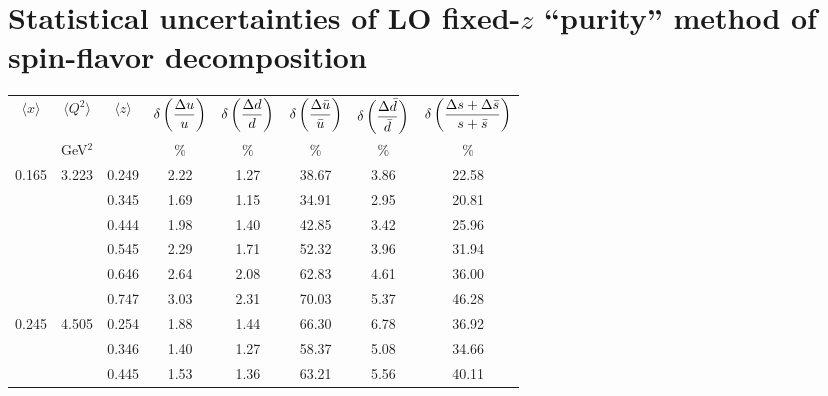 \section{ Statistical uncertainties of LO fixed-$z$ ``purity''  method of spin-flavor decomposition}
\begin{table}[htbp]
\begin{center}
\begin{tabular}{|ccc||ccccc|}
\hline
$\langle x \rangle $   & $ \langle Q^2 \rangle $   &  $\langle z \rangle$ & $\displaystyle{\delta \left({ \Delta u \over u} \right)}$  & $\displaystyle{\delta \left({ \Delta d \over d} \right)}$&
$\displaystyle{ \delta \left({ \Delta \bar{u} \over\bar{u}} \right)}$ & $\displaystyle{\delta \left({ \Delta \bar{d} \over\bar{d}} \right)}$ &  $\displaystyle{\delta \left({ \Delta s + \Delta  \bar{s} \over s+ \bar{s}} \right)}$  \\
                       & GeV$^2$              &        &  $\%$  &   $\%$    &  $\%$    &     $\%$    &       $\%$                                                   \\ \hline 
  0.165 &   3.223 &   0.249 &         2.22 &         1.27 &        38.67 &         3.86 &        22.58 \\
         &          &    0.345 &         1.69 &         1.15 &        34.91 &         2.95 &        20.81 \\
         &          &    0.444 &         1.98 &         1.40 &        42.85 &         3.42 &        25.96 \\
         &          &    0.545 &         2.29 &         1.71 &        52.32 &         3.96 &        31.94 \\
         &          &    0.646 &         2.64 &         2.08 &        62.83 &         4.61 &        36.00 \\
         &          &    0.747 &         3.03 &         2.31 &        70.03 &         5.37 &        46.28 \\
   0.245 &   4.505 &   0.254 &         1.88 &         1.44 &        66.30 &         6.78 &        36.92 \\
         &          &    0.346 &         1.40 &         1.27 &        58.37 &         5.08 &        34.66 \\
         &          &    0.445 &         1.53 &         1.36 &        63.21 &         5.56 &        40.11 \\

\end{tabular}
\end{center}
\end{table}
